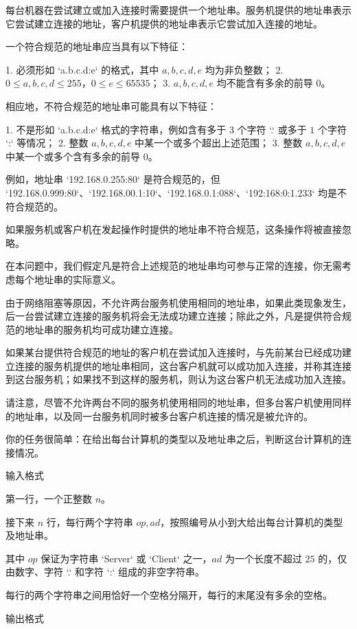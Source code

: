 \documentclass[12pt,twiside,a4paper]{ctexbook}
\numberwithin{chapter}{part}
\begin{document}
每台机器在尝试建立或加入连接时需要提供一个地址串。服务机提供的地址串表示它尝试建立连接的地址，客户机提供的地址串表示它尝试加入连接的地址。

一个符合规范的地址串应当具有以下特征：

1. 必须形如 `a.b.c.d:e` 的格式，其中 $a, b, c, d, e$ 均为非负整数；
2. $0 \le a, b, c, d \le 255$，$0 \le e \le 65535$；
3. $a, b, c, d, e$ 均不能含有多余的前导 $0$。

相应地，不符合规范的地址串可能具有以下特征：

1. 不是形如 `a.b.c.d:e` 格式的字符串，例如含有多于 $3$ 个字符 `.` 或多于 $1$ 个字符 `:` 等情况；
2. 整数 $a, b, c, d, e$ 中某一个或多个超出上述范围；
3. 整数 $a, b, c, d, e$ 中某一个或多个含有多余的前导 $0$。

例如，地址串 `192.168.0.255:80` 是符合规范的，但 `192.168.0.999:80`、`192.168.00.1:10`、`192.168.0.1:088`、`192:168:0:1.233` 均是不符合规范的。

如果服务机或客户机在发起操作时提供的地址串不符合规范，这条操作将被直接忽略。

在本问题中，我们假定凡是符合上述规范的地址串均可参与正常的连接，你无需考虑每个地址串的实际意义。

由于网络阻塞等原因，不允许两台服务机使用相同的地址串，如果此类现象发生，后一台尝试建立连接的服务机将会无法成功建立连接；除此之外，凡是提供符合规范的地址串的服务机均可成功建立连接。

如果某台提供符合规范的地址的客户机在尝试加入连接时，与先前某台已经成功建立连接的服务机提供的地址串相同，这台客户机就可以成功加入连接，并称其连接到这台服务机；如果找不到这样的服务机，则认为这台客户机无法成功加入连接。

请注意，尽管不允许两台不同的服务机使用相同的地址串，但多台客户机使用同样的地址串，以及同一台服务机同时被多台客户机连接的情况是被允许的。

你的任务很简单：在给出每台计算机的类型以及地址串之后，判断这台计算机的连接情况。

 输入格式

第一行，一个正整数 $n$。

接下来 $n$ 行，每行两个字符串 $\mathit{op}, \mathit{ad}$，按照编号从小到大给出每台计算机的类型及地址串。

其中 $\mathit{op}$ 保证为字符串 `Server` 或 `Client` 之一，$\mathit{ad}$ 为一个长度不超过 $25$ 的，仅由数字、字符 `.` 和字符 `:` 组成的非空字符串。

每行的两个字符串之间用恰好一个空格分隔开，每行的末尾没有多余的空格。

 输出格式
\end{document}
